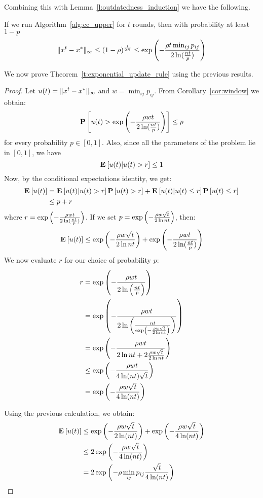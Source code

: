 Combining this with Lemma~\ref{l:outdatedness_induction} we have
the following.
\begin{corollary}\label{cor:window}
If we run Algorithm~\ref{alg:cc_upper} for $t$ rounds, then with probability at least
$1-p$
$$ \| x^{t}-x^* \|_{\infty} \leq (1-\rho)^{\frac{t}{2B}}
\leq \exp \left(-\frac{\rho t\min_{ij}p_{ij}}{2\ln( \frac{nt}{p})} \right)$$
\end{corollary}
We now prove Theorem~\ref{t:exponential_update_rule} using the previous results.
\begin{proof}
Let $u(t) = \| x^t-x^* \|_{\infty}$ and $w = \min_{ij}p_{ij}$.
From Corollary~\ref{cor:window} we obtain:
$$ \bm{\mathrm{P}}\left[u(t) >\exp\left(-\frac{\rho wt}{2\ln( \frac{nt}{p})} \right)\right] \leq p $$
for every probability $p \in [0,1]$. Also, since all the
parameters of the problem lie in $[0,1]$, we have
$$\Exp{u(t)|u(t) > r} \leq 1$$
Now, by the conditional expectations identity, we get:
\begin{align*}
\Exp{u(t)} &= \Exp{u(t)|u(t) > r}\Prob{u(t) > r} +\Exp{u(t)|u(t) \leq r}\Prob{u(t) \leq r}\\
&\leq p + r
\end{align*}
where $r = \exp \left(-\frac{\rho wt}{2\ln( \frac{nt}{p})}\right)$.
If we set $p = \exp \left(-\frac{\rho w\sqrt{t}}{2\ln nt}\right)$, then:
$$
\Exp{u(t)} \leq \exp \lp(-\frac{\rho w\sqrt{t}}{2\ln nt}\rp)
+ \exp \lp(-\frac{\rho wt}{2\ln( \frac{nt}{p})}\rp)
$$
We now evaluate $r$ for our choice of probability $p$:
\begin{align*}
r
&= \exp \left(-\frac{\rho wt}{2\ln\left( \frac{nt}{p}\right)} \right)\\
&= \exp \left(-\frac{\rho wt}{2\ln\left( \frac{nt}{\exp \left(-\frac{\rho w\sqrt{t}}{2\ln nt}\right) }\right) } \right) \\
&= \exp \left(-\frac{\rho wt}{2\ln nt + 2\frac{\rho w\sqrt{t}}{2\ln nt} }\right)\\
&\leq \exp \left(-\frac{\rho w t}{4\ln(nt) \sqrt{t}}\right)\\
&= \exp \left(-\frac{\rho w\sqrt{t}}{4\ln(nt)}\right)
\end{align*}

Using the previous calculation, we obtain:
\begin{align*}
\Exp{u(t)} &\leq \exp \lp(-\frac{\rho w\sqrt{t}}{2\ln (nt)}\rp) +
\exp \lp(-\frac{\rho w\sqrt{t}}{4\ln(nt)}\rp) \\
&\leq 2\exp \lp(-\frac{\rho w\sqrt{t}}{4\ln(nt)}\rp)\\
&=
    2\exp \lp(- \rho  \min_{ij} p_{ij} \frac{\sqrt{t}}{4\ln(nt)} \rp)
\end{align*}
\end{proof}
